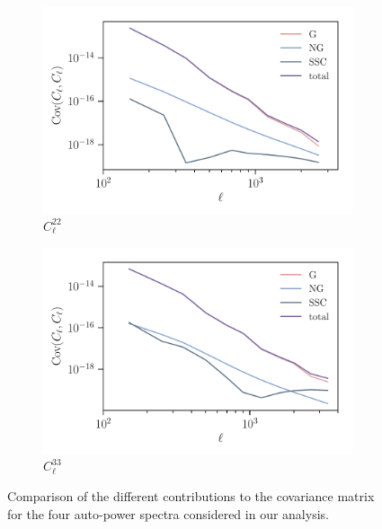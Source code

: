 \documentclass[a4paper,11pt]{article}
\begin{document}
\begin{figure}
\begin{center}
        \begin{subfigure}{0.49\textwidth}
        \includegraphics[width=\textwidth]{figures/covmat_HSC_dg_hoddg_hodxdg_hoddg_hod_trisp=4h3h2h_SSC=LINBIAS-resp_l=ells_eff_all_wcross_clfit=HOD-zevol_culled=True_coadd=area_comparison=G+NG+SSC_bin=2.pdf}
        \caption{$C_{\ell}^{22}$}
        \end{subfigure}
        \begin{subfigure}{0.49\textwidth}
        \includegraphics[width=\textwidth]{figures/covmat_HSC_dg_hoddg_hodxdg_hoddg_hod_trisp=4h3h2h_SSC=LINBIAS-resp_l=ells_eff_all_wcross_clfit=HOD-zevol_culled=True_coadd=area_comparison=G+NG+SSC_bin=3.pdf}
        \caption{$C_{\ell}^{33}$}
        \end{subfigure}
        \caption{Comparison of the different contributions to the covariance matrix for the four auto-power spectra considered in our analysis.} \label{fig:covariance-contributions}
      \end{center}
    \end{figure}
\end{document}
